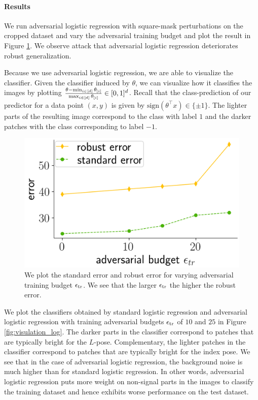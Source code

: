 \paragraph{Results} We run adversarial logistic regression with square-mask perturbations on the cropped dataset and vary the adversarial training budget and plot the result in Figure \ref{fig:eps_mask}. We observe attack that adversarial logistic regression deteriorates robust generalization. 

Because we use adversarial logistic regression, we are able to visualize the classifier. Given the classifier induced by $\theta$, we can visualize how it classifies the images by plotting $\frac{\theta - \min_{i \in [d]}\theta_{[i]}}{\max_{i \in [d]}\theta_{[i]}} \in [0,1]^{d}$. Recall that the class-prediction of our predictor for a data point $(x,y)$ is given by $\text{sign}(\theta^{\top} x) \in \{\pm 1\}$. The lighter parts of the resulting image correspond to the class with label $1$ and the darker patches with the class corresponding to label $-1$.

\begin{figure}
\includegraphics[width=0.99\linewidth]{plotsAistats/mask_plot_main.png}
\caption{We plot the standard error and robust error for varying adversarial training budget $\epsilon_{\text{tr}}$. We see that the larger $\epsilon_{\text{tr}}$ the higher the robust error.}
\label{fig:eps_mask}
\end{figure}

We plot the classifiers obtained by standard logistic regression and adversarial logistic regression with training adversarial budgets $\epsilon_{\text{tr}}$ of $10$ and $25$ in Figure \ref{fig:visulation_log}. The darker parts in the classifier correspond to patches that are typically bright for the $L$-pose. Complementary, the lighter patches in the classifier correspond to patches that are typically bright for the index pose. We see that in the case of adversarial logistic regression, the background noise is much higher than for standard logistic regression. In other words, adversarial logistic regression puts more weight on non-signal parts in the images to classify the training dataset and hence exhibits worse performance on the test dataset.
 
